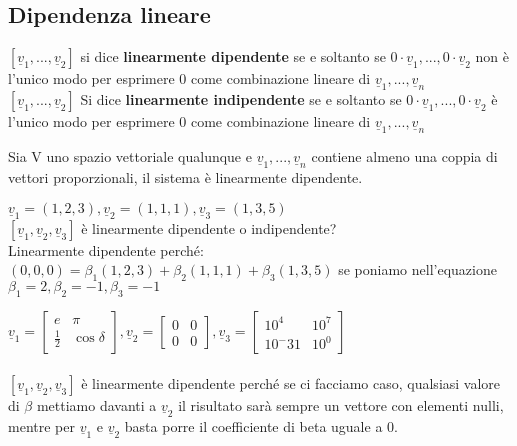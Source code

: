 \subsection{Dipendenza lineare}
$[\underline{v}_1,...,\underline{v}_2]$ si dice \textbf{linearmente dipendente} se e soltanto se $0\cdot \underline{v}_1,...,0\cdot \underline{v}_2$ non è l'unico modo per esprimere 0 come combinazione lineare di $\underline{v}_1,...,\underline{v}_n$\\
$[\underline{v}_1,...,\underline{v}_2]$ Si dice \textbf{linearmente indipendente} se e soltanto se $0\cdot \underline{v}_1,...,0\cdot \underline{v}_2$ è l'unico modo per esprimere 0 come combinazione lineare di $\underline{v}_1,...,\underline{v}_n$
\begin{proposizione}
	Sia V uno spazio vettoriale qualunque e $\underline{v}_1,...,\underline{v}_n$ contiene almeno una coppia di vettori proporzionali, il sistema è linearmente dipendente.
\end{proposizione}

\begin{es}
	$\underline{v}_1=(1,2,3),\underline{v}_2=(1,1,1),\underline{v}_3=(1,3,5)$\\
	$[\underline{v}_1,\underline{v}_2,\underline{v}_3]$ è linearmente dipendente o indipendente?\\
	Linearmente dipendente perché: $(0,0,0)=\beta_1(1,2,3)+\beta_2(1,1,1)+\beta_3(1,3,5)$ se poniamo nell'equazione $\beta_1=2,\beta_2=-1,\beta_3=-1$
\end{es}

\begin{es}
	$\underline{v}_1=\begin{bmatrix}
		e           & \pi\\
		\frac{1}{2} & \cos \delta
	\end{bmatrix}, \underline{v}_2=\begin{bmatrix}
		0 & 0\\
		0 & 0
	\end{bmatrix}, \underline{v}_3=\begin{bmatrix}
		10^4   & 10^7\\
		10^-31 & 10^0
	\end{bmatrix}$\\\\
	$[\underline{v}_1,\underline{v}_2,\underline{v}_3]$ è linearmente dipendente perché se ci facciamo caso, qualsiasi valore di $\beta$ mettiamo davanti a $\underline{v}_2$ il risultato sarà sempre un vettore con elementi nulli, mentre per $\underline{v}_1$ e $\underline{v}_2$ basta porre il coefficiente di beta uguale a 0.
\end{es}

